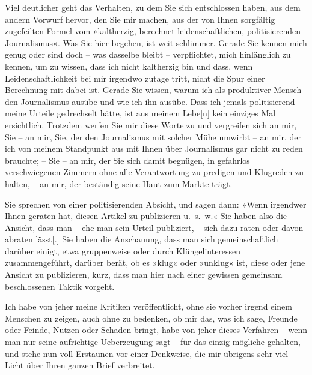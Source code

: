 \pstart
           Viel deutlicher geht das Verhalten, zu dem Sie sich entschlossen haben, aus dem
               andern Vorwurf hervor, den Sie mir machen, aus der von Ihnen sorgfältig zugefeilten
               Formel vom »kaltherzig, berechnet leidenschaftlichen, politisierenden Journalismus«.
               Was Sie hier begehen, ist weit schlimmer. Gerade Sie kennen mich genug oder sind doch
               – was dasselbe bleibt – verpflichtet, mich hinlänglich zu kennen, um zu wissen, dass
               ich nicht kaltherzig bin und dass, wenn Leidenschaftlichkeit bei mir irgendwo zutage
               tritt, nicht die Spur einer Berechnung mit dabei ist. Gerade Sie wissen, warum ich
               als produktiver Mensch den Journalismus ausübe und wie ich ihn ausübe. Dass ich
               jemals politisierend meine Urteile gedrechselt hätte, ist aus meinem
                  Lebe{[}n{]} kein einziges Mal ersichtlich. Trotzdem werfen Sie mir
               diese Worte zu und vergreifen sich an mir, Sie – an mir, Sie, der den Journalismus
               mit solcher Mühe umwirbt – an mir, der ich von meinem Standpunkt aus mit Ihnen über
               Journalismus gar nicht zu reden brauchte; – Sie – an mir, der Sie sich damit
               begnügen, in gefahrlos verschwiegenen Zimmern ohne alle Verantwortung zu pre{\pb}digen und Klugreden zu halten, –
               an mir, der beständig seine Haut zum Markte trägt.\pend
           
\pstart
           Sie sprechen von einer politisierenden Absicht, und sagen dann: »Wenn irgendwer Ihnen
               geraten hat, diesen Artikel zu publizieren u. s. w.« Sie haben also die Ansicht, dass
               man – ehe man sein Urteil publiziert, – sich dazu raten oder davon abraten
                  lässt{[}.{]} Sie haben die Anschauung, dass man sich
               gemeinschaftlich darüber einigt, etwa gruppenweise oder durch Klüngelinteressen
               zusammengeführt, darüber berät, ob es »klug« oder »unklug« ist, diese oder jene
               Ansicht zu publizieren, kurz, dass man hier nach einer gewissen gemeinsam
               beschlossenen Taktik vorgeht.\pend
           
\pstart
           Ich habe von jeher meine Kritiken veröffentlicht, ohne sie vorher irgend einem
               Menschen zu zeigen, auch ohne zu bedenken, ob mir das, was ich sage, Freunde oder
               Feinde, Nutzen oder Schaden bringt, habe von jeher dieses Verfahren – wenn man nur
               seine aufrichtige Ueberzeugung sagt – für das einzig mögliche gehalten, und stehe nun
               voll Erstaunen vor einer Denkweise, die mir übrigens sehr viel Licht über Ihren
               ganzen Brief verbreitet.\pend
           
